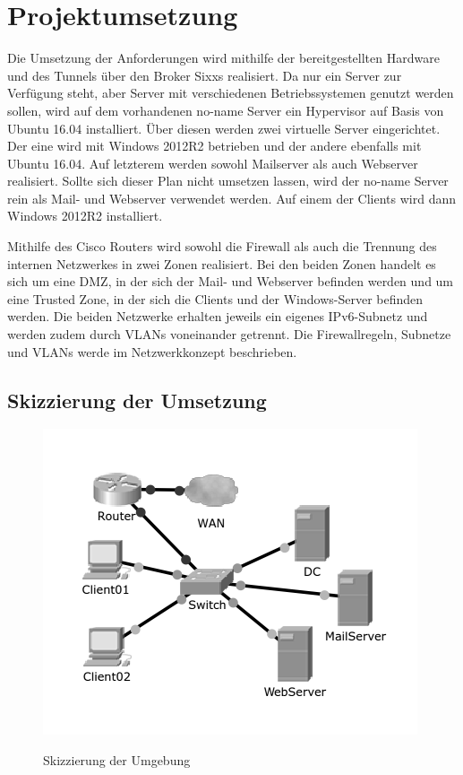 \section{Projektumsetzung}

Die Umsetzung der Anforderungen wird mithilfe der bereitgestellten Hardware und des Tunnels über den Broker Sixxs realisiert. Da nur ein Server zur Verfügung steht, aber Server mit verschiedenen Betriebssystemen genutzt werden sollen, wird auf dem vorhandenen no-name Server ein Hypervisor auf Basis von Ubuntu 16.04 installiert. Über diesen werden zwei virtuelle Server eingerichtet. Der eine wird mit Windows 2012R2 betrieben und der andere ebenfalls mit Ubuntu 16.04. Auf letzterem werden sowohl Mailserver als auch Webserver realisiert. Sollte sich dieser Plan nicht umsetzen lassen, wird der no-name Server rein als Mail- und Webserver verwendet werden. Auf einem der Clients wird dann Windows 2012R2 installiert.

Mithilfe des Cisco Routers wird sowohl die Firewall als auch die Trennung des internen Netzwerkes in zwei Zonen realisiert. Bei den beiden Zonen handelt es sich um eine DMZ, in der sich der Mail- und Webserver befinden werden und um eine Trusted Zone, in der sich die Clients und der Windows-Server befinden werden. Die beiden Netzwerke erhalten jeweils ein eigenes IPv6-Subnetz und werden zudem durch VLANs voneinander getrennt. Die Firewallregeln, Subnetze und VLANs werde im Netzwerkkonzept beschrieben.

\subsection{Skizzierung der Umsetzung}

\begin{figure}
\includegraphics[scale=0.5]{../packettracer/8gruppe_netzaufbau.png}
\label{skizzierung-umsetzung}
\caption{Skizzierung der Umgebung}
\end{figure}

